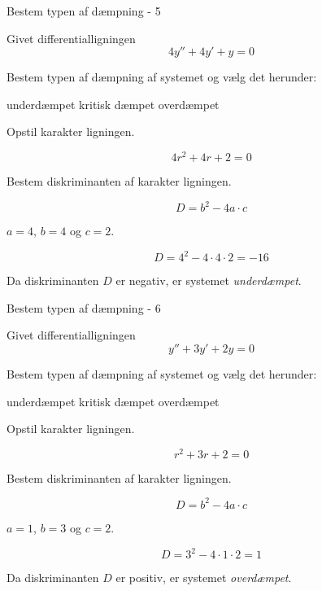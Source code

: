 \documentclass{article}
\begin{document}
\begin{exercise}{Bestem typen af dæmpning - 5}

Givet differentialligningen
\[
4y'' + 4y' + y = 0
\]

Bestem typen af dæmpning af systemet og vælg det herunder:
\begin{multichoice}
\itemtrue underdæmpet
\itemfalse kritisk dæmpet
\itemfalse overdæmpet
\end{multichoice}


\hint
Opstil karakter ligningen.

\hint
\[
4r^2 + 4r + 2 = 0
\]

\hint
Bestem diskriminanten af karakter ligningen.

\hint
\[
D = b^2 - 4 a \cdot c
\]

\hint
$a = 4$, $b = 4$ og $c = 2$.

\hint
\[
D = 4^2 - 4 \cdot 4 \cdot 2 = -16
\]

\hint
Da diskriminanten $D$ er negativ, er systemet \emph{underdæmpet}.

\end{exercise}

\newpage

\begin{exercise}{Bestem typen af dæmpning - 6}

Givet differentialligningen
\[
y'' + 3y' + 2y = 0
\]

Bestem typen af dæmpning af systemet og vælg det herunder:
\begin{multichoice}
\itemtrue underdæmpet
\itemfalse kritisk dæmpet
\itemfalse overdæmpet
\end{multichoice}


\hint
Opstil karakter ligningen.

\hint
\[
r^2 + 3r + 2 = 0
\]

\hint
Bestem diskriminanten af karakter ligningen.

\hint
\[
D = b^2 - 4 a \cdot c
\]

\hint
$a = 1$, $b = 3$ og $c = 2$.

\hint
\[
D = 3^2 - 4 \cdot 1 \cdot 2 = 1
\]

\hint
Da diskriminanten $D$ er positiv, er systemet \emph{overdæmpet}.

\end{exercise}
\end{document}
